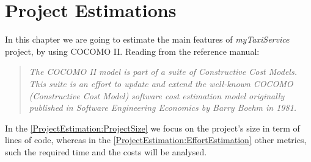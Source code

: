 \documentclass[\mainpath/main]{subfiles}
\begin{document}
\chapter{Project Estimations} %
\label{ProjectEstimation}

\setmyfancystyle

In this chapter we are going to estimate the main features of \textit{myTaxiService} project, by using COCOMO II. Reading from the reference manual:
\begin{quote}
	\textit{The COCOMO II model is part of a suite of Constructive Cost Models. This suite is an effort to update and extend the well-known COCOMO (Constructive Cost Model) software cost estimation model originally published in Software Engineering Economics by Barry Boehm in 1981.}
\end{quote}
In the \autoref{ProjectEstimation:ProjectSize} we focus on the project's size in term of lines of code, whereas in the \autoref{ProjectEstimation:EffortEstimation} other metrics, such the required time and the costs will be analysed.
\end{document}
